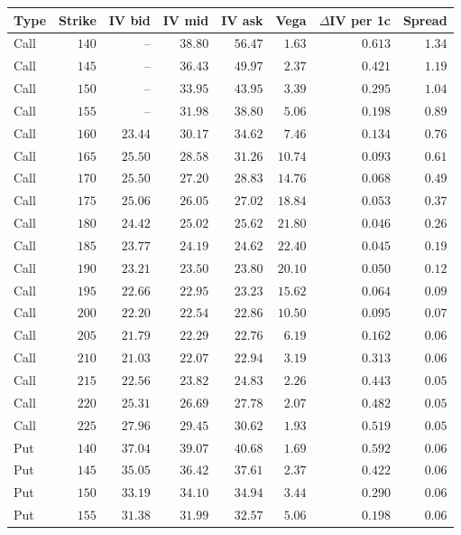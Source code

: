 \begin{tabular}{lrrrrrrr}
\toprule
Type & Strike & IV bid & IV mid & IV ask & Vega & \(\Delta\)IV per 1c & Spread \\
\midrule
Call & $140$ & -- & $38.80$ & $56.47$ & $1.63$ & $0.613$ & $1.34$ \\
Call & $145$ & -- & $36.43$ & $49.97$ & $2.37$ & $0.421$ & $1.19$ \\
Call & $150$ & -- & $33.95$ & $43.95$ & $3.39$ & $0.295$ & $1.04$ \\
Call & $155$ & -- & $31.98$ & $38.80$ & $5.06$ & $0.198$ & $0.89$ \\
Call & $160$ & $23.44$ & $30.17$ & $34.62$ & $7.46$ & $0.134$ & $0.76$ \\
Call & $165$ & $25.50$ & $28.58$ & $31.26$ & $10.74$ & $0.093$ & $0.61$ \\
Call & $170$ & $25.50$ & $27.20$ & $28.83$ & $14.76$ & $0.068$ & $0.49$ \\
Call & $175$ & $25.06$ & $26.05$ & $27.02$ & $18.84$ & $0.053$ & $0.37$ \\
Call & $180$ & $24.42$ & $25.02$ & $25.62$ & $21.80$ & $0.046$ & $0.26$ \\
Call & $185$ & $23.77$ & $24.19$ & $24.62$ & $22.40$ & $0.045$ & $0.19$ \\
Call & $190$ & $23.21$ & $23.50$ & $23.80$ & $20.10$ & $0.050$ & $0.12$ \\
Call & $195$ & $22.66$ & $22.95$ & $23.23$ & $15.62$ & $0.064$ & $0.09$ \\
Call & $200$ & $22.20$ & $22.54$ & $22.86$ & $10.50$ & $0.095$ & $0.07$ \\
Call & $205$ & $21.79$ & $22.29$ & $22.76$ & $6.19$ & $0.162$ & $0.06$ \\
Call & $210$ & $21.03$ & $22.07$ & $22.94$ & $3.19$ & $0.313$ & $0.06$ \\
Call & $215$ & $22.56$ & $23.82$ & $24.83$ & $2.26$ & $0.443$ & $0.05$ \\
Call & $220$ & $25.31$ & $26.69$ & $27.78$ & $2.07$ & $0.482$ & $0.05$ \\
Call & $225$ & $27.96$ & $29.45$ & $30.62$ & $1.93$ & $0.519$ & $0.05$ \\
Put & $140$ & $37.04$ & $39.07$ & $40.68$ & $1.69$ & $0.592$ & $0.06$ \\
Put & $145$ & $35.05$ & $36.42$ & $37.61$ & $2.37$ & $0.422$ & $0.06$ \\
Put & $150$ & $33.19$ & $34.10$ & $34.94$ & $3.44$ & $0.290$ & $0.06$ \\
Put & $155$ & $31.38$ & $31.99$ & $32.57$ & $5.06$ & $0.198$ & $0.06$ \\

\end{tabular}
